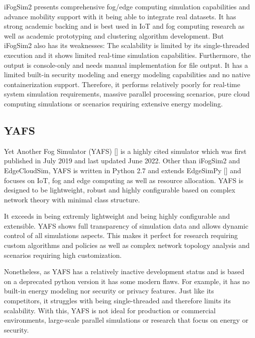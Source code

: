 iFogSim2 presents comprehensive fog/edge computing simulation capabilities and advance mobility support with it being able to integrate real datasets.
It has strong academic backing and is best used in IoT and fog computing research as well as academic prototyping and clustering algorithm development.
But iFogSim2 also has its weaknesses:
The scalability is limited by its single-threaded execution and it shows limited real-time simulation capabilities.
Furthermore, the output is console-only and needs manual implementation for file output.
It has a limited built-in security modeling and energy modeling capabilities and no native containerization support.
Therefore, it performs relatively poorly for real-time system simulation requirements, massive parallel processing scenarios, pure cloud computing simulations or 
scenarios requiring extensive energy modeling.

\subsection{YAFS}\label{sec:YAFS}
Yet Another Fog Simulator (YAFS) [\cite{sim-yafs}] is a highly cited simulator which was first published in July 2019 and last updated June 2022.
Other than iFogSim2 and EdgeCloudSim, YAFS is written in Python 2.7 and extends EdgeSimPy [\cite{sim-base-edgeSimpy}] and focuses on IoT, fog and edge computing as well as resource allocation.
YAFS is designed to be lightweight, robust and highly configurable based on complex network theory with minimal class structure.

It exceeds in being extremly lightweight and being highly configurable and extensible. 
YAFS shows full transparency of simulation data and allows dynamic control of all simulations aspects.
This makes it perfect for research requiring custom algorithms and policies as well as complex network topology analysis and scenarios requiring high customization.

Nonetheless, as YAFS has a relatively inactive development status and is based on a deprecated python version it has some modern flaws.
For example, it has no built-in energy modeling nor security or privacy features.
Just like its competitors, it struggles with being single-threaded and therefore limits its scalability.
With this, YAFS is not ideal for production or commercial environments, large-scale parallel simulations or research that focus on energy or security.

